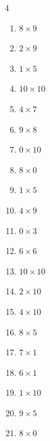 \begin{multicols}{4}
\begin{enumerate}
  \item $8\times 9$
        \phantom{$=72$}

  \item $2\times 9$
        \phantom{$=18$}

  \item $1\times 5$
        \phantom{$=5$}

  \item $10\times 10$
        \phantom{$=100$}

  \item $4\times 7$
        \phantom{$=28$}

  \item $9\times 8$
        \phantom{$=72$}

  \item $0\times 10$
        \phantom{$=0$}

  \item $8\times 0$
        \phantom{$=0$}

  \item $1\times 5$
        \phantom{$=5$}

  \item $4\times 9$
        \phantom{$=36$}

  \item $0\times 3$
        \phantom{$=0$}

  \item $6\times 6$
        \phantom{$=36$}

  \item $10\times 10$
        \phantom{$=100$}

  \item $2\times 10$
        \phantom{$=20$}

  \item $4\times 10$
        \phantom{$=40$}

  \item $8\times 5$
        \phantom{$=40$}

  \item $7\times 1$
        \phantom{$=7$}

  \item $6\times 1$
        \phantom{$=6$}

  \item $1\times 10$
        \phantom{$=10$}

  \item $9\times 5$
        \phantom{$=45$}

  \item $8\times 0$
        \phantom{$=0$}


\end{enumerate}
\end{multicols}
